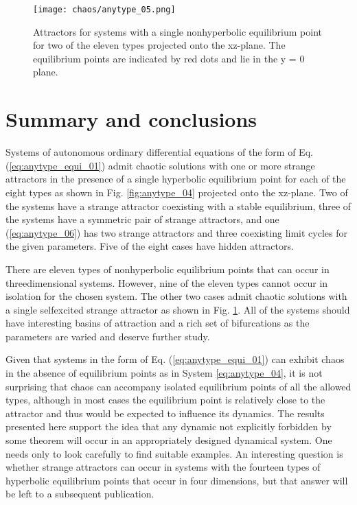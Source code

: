 \begin{figure}[htbp]
\centering
\texttt{[image: chaos/anytype\_05.png]}
\caption{\label{fig:anytype_05}
Attractors for systems with a single nonhyperbolic equilibrium point for two of the
eleven types projected onto the xz-plane. The equilibrium points are indicated by red dots
and lie in the y = 0 plane.
}
\end{figure}

\section{Summary and conclusions}
Systems of autonomous ordinary differential equations of the form of Eq. (\ref{eq:anytype_equi_01}) admit
chaotic solutions with one or more strange attractors in the presence of a single
hyperbolic equilibrium point for each of the eight types as shown in Fig. \ref{fig:anytype_04} projected
onto the xz-plane. Two of the systems have a strange attractor coexisting with a
stable equilibrium, three of the systems have a symmetric pair of strange attractors,
and one (\ref{eq:anytype_06}) has two strange attractors and three coexisting limit cycles for the
given parameters. Five of the eight cases have hidden attractors.

There are eleven types of nonhyperbolic equilibrium points that can occur in threedimensional
systems. However, nine of the eleven types cannot occur in isolation for
the chosen system. The other two cases admit chaotic solutions with a single selfexcited
strange attractor as shown in Fig. \ref{fig:anytype_05}. All of the systems should have interesting
basins of attraction \cite{chaudhuri2014complicated} and a rich set of bifurcations as the parameters are varied
and deserve further study.

Given that systems in the form of Eq. (\ref{eq:anytype_equi_01}) can exhibit chaos in the absence of
equilibrium points as in System \ref{eq:anytype_04}, it is not surprising that chaos can accompany
isolated equilibrium points of all the allowed types, although in most cases the equilibrium
point is relatively close to the attractor and thus would be expected to influence
its dynamics. The results presented here support the idea that any dynamic not explicitly
forbidden by some theorem will occur in an appropriately designed dynamical
system. One needs only to look carefully to find suitable examples. An interesting
question is whether strange attractors can occur in systems with the fourteen types
of hyperbolic equilibrium points that occur in four dimensions, but that answer will
be left to a subsequent publication.



